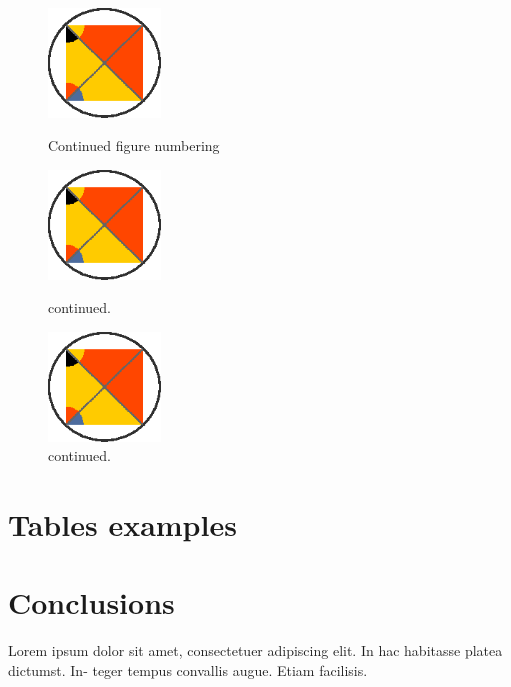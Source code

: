 \documentclass{aa}
\begin{document}

    \begin{figure}
    \centering
    \includegraphics[width=3cm]{figure.eps}
      \caption{Continued figure numbering}
         \label{cont1}
    
    \centering
    \ContinuedFloat %
    \includegraphics[width=3cm]{figure.eps}
        \caption{continued.}
             \label{cont2}

    \centering
    \ContinuedFloat %
    \includegraphics[width=3cm]{figure.eps}
        \caption{continued.}
             \label{cont3}
    \end{figure}


\clearpage

\section{Tables examples}






\section{Conclusions}
Lorem ipsum dolor sit amet,
consectetuer adipiscing elit. In hac habitasse platea dictumst. In-
teger tempus convallis augue. Etiam facilisis.
\end{document}
